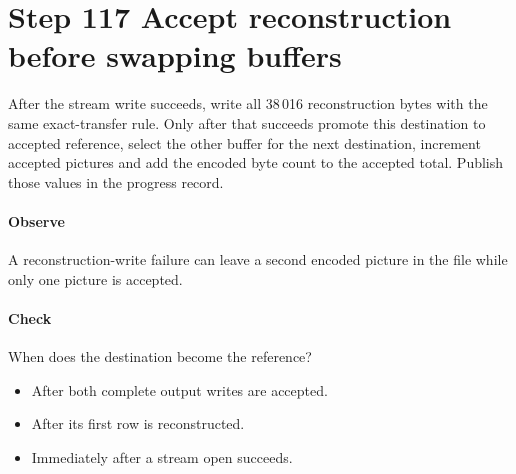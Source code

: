 \section{Step 117 Accept reconstruction before swapping buffers}\label{h263-clip-s07}
After the stream write succeeds, write all 38\,016 reconstruction bytes with the
same exact-transfer rule. Only after that succeeds promote this destination to
accepted reference, select the other buffer for the next destination, increment
accepted pictures and add the encoded byte count to the accepted total. Publish
those values in the progress record.

\paragraph{Observe} A reconstruction-write failure can leave a second encoded picture in the file while only one picture is accepted.
\paragraph{Check} When does the destination become the reference?
\begin{itemize}
  \item[A.] After both complete output writes are accepted.
  \item[B.] After its first row is reconstructed.
  \item[C.] Immediately after a stream open succeeds.
\end{itemize}
